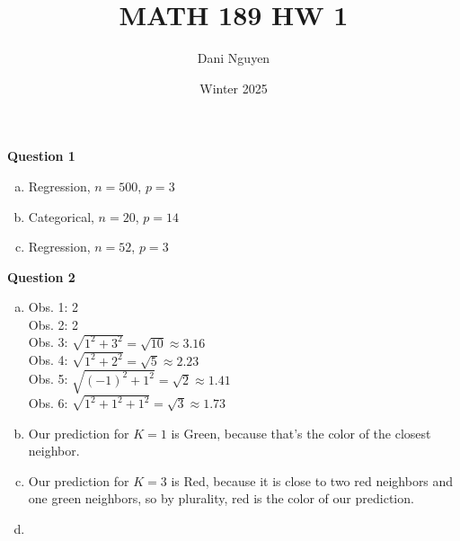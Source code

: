 \documentclass[12pt, letterpaper]{article}
\title{MATH 189 HW 1}
\author{Dani Nguyen}
\date{Winter 2025}
\begin{document}
\maketitle

\noindent \textbf{Question 1}
\begin{enumerate}[a.]
    \item Regression, $n = 500$, $p = 3$
    \item Categorical, $n =20$, $p = 14$
    \item Regression, $n = 52$, $p = 3$
\end{enumerate}

\noindent \textbf{Question 2}
\begin{enumerate}[a.]
    \item Obs. 1: 2 \\
          Obs. 2: 2 \\
          Obs. 3: $\sqrt{1^2+3^2} = \sqrt{10} \approx 3.16$ \\
          Obs. 4: $\sqrt{1^2+2^2} = \sqrt{5} \approx 2.23$ \\
          Obs. 5: $\sqrt{(-1)^2 + 1^2} = \sqrt{2} \approx 1.41$ \\
          Obs. 6: $\sqrt{1^2+1^2+1^2} = \sqrt{3} \approx 1.73$ 
    \item Our prediction for $K=1$ is Green, because that's the color of the closest neighbor.
    \item Our prediction for $K=3$ is Red, because it is close to two red neighbors and one green neighbors, so by plurality, red is the color of our prediction.
    \item 
\end{enumerate}
\end{document}
